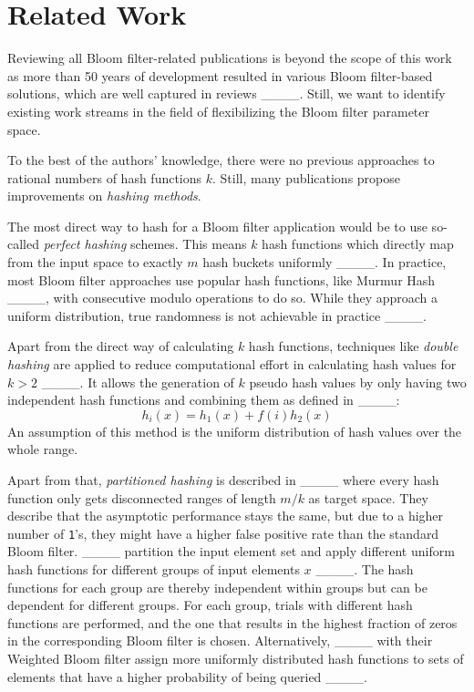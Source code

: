 \section{Related Work}
Reviewing all Bloom filter-related publications is beyond the scope of this work as more than 50 years of development resulted in various Bloom filter-based solutions, which are well captured in reviews ____. Still, we want to identify existing work streams in the field of flexibilizing the Bloom filter parameter space.%

To the best of the authors' knowledge, there were no previous approaches to rational numbers of hash functions $k$. Still, many publications propose improvements on \textit{hashing methods}.

The most direct way to hash for a Bloom filter application would be to use so-called \textit{perfect hashing} schemes. This means $k$ hash functions which directly map from the input space to exactly $m$ hash buckets uniformly ____.
In practice, most Bloom filter approaches use popular hash functions, like Murmur Hash ____, with consecutive modulo operations to do so. While they approach a uniform distribution, true randomness is not achievable in practice ____. 

Apart from the direct way of calculating $k$ hash functions, techniques like \textit{double hashing} are applied to reduce computational effort in calculating hash values for $k>2$ ____. It allows the generation of $k$ pseudo hash values by only having two independent hash functions and combining them as defined in ____:
\begin{equation}
    h_i(x)=h_1(x)+f(i)h_2(x)
    \label{eq:efficienthash}
\end{equation}
An assumption of this method is the uniform distribution of hash values over the whole range.

Apart from that, \textit{partitioned hashing} is described in ____ where every hash function only gets disconnected ranges of length $m/k$ as target space. They describe that the asymptotic performance stays the same, but due to a higher number of \texttt{1}'s, they might have a higher false positive rate than the standard Bloom filter. 
____ partition the input element set and apply different uniform hash functions for different groups of input elements $x$ ____. The hash functions for each group are thereby independent within groups but can be dependent for different groups. For each group, trials with different hash functions are performed, and the one that results in the highest fraction of zeros in the corresponding Bloom filter is chosen. Alternatively, ____ with their Weighted Bloom filter assign more uniformly distributed hash functions to sets of elements that have a higher probability of being queried ____.

